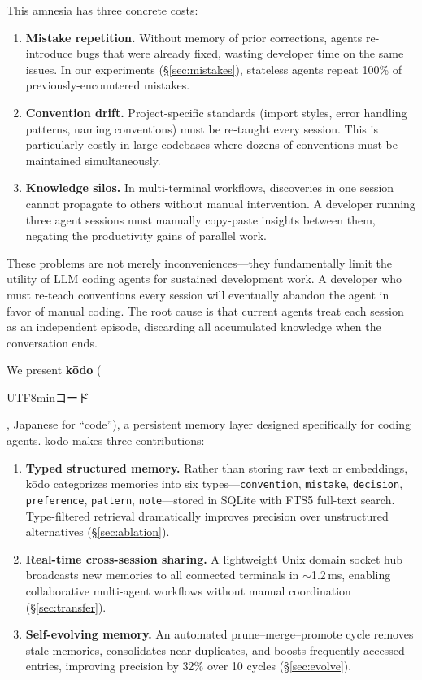 \documentclass{article}
\begin{document}
This amnesia has three concrete costs:
\begin{enumerate}
    \item \textbf{Mistake repetition.} Without memory of prior corrections, agents re-introduce bugs that were already fixed, wasting developer time on the same issues. In our experiments (\S\ref{sec:mistakes}), stateless agents repeat 100\% of previously-encountered mistakes.
    \item \textbf{Convention drift.} Project-specific standards (import styles, error handling patterns, naming conventions) must be re-taught every session. This is particularly costly in large codebases where dozens of conventions must be maintained simultaneously.
    \item \textbf{Knowledge silos.} In multi-terminal workflows, discoveries in one session cannot propagate to others without manual intervention. A developer running three agent sessions must manually copy-paste insights between them, negating the productivity gains of parallel work.
\end{enumerate}

These problems are not merely inconveniences---they fundamentally limit the utility of LLM coding agents for sustained development work. A developer who must re-teach conventions every session will eventually abandon the agent in favor of manual coding. The root cause is that current agents treat each session as an independent episode, discarding all accumulated knowledge when the conversation ends.

We present \textbf{k\=odo} (\begin{CJK}{UTF8}{min}コード\end{CJK}, Japanese for ``code''), a persistent memory layer designed specifically for coding agents. k\=odo makes three contributions:

\begin{enumerate}
    \item \textbf{Typed structured memory.} Rather than storing raw text or embeddings, k\=odo categorizes memories into six types---\texttt{convention}, \texttt{mistake}, \texttt{decision}, \texttt{preference}, \texttt{pattern}, \texttt{note}---stored in SQLite with FTS5 full-text search. Type-filtered retrieval dramatically improves precision over unstructured alternatives (\S\ref{sec:ablation}).
    \item \textbf{Real-time cross-session sharing.} A lightweight Unix domain socket hub broadcasts new memories to all connected terminals in $\sim$1.2\,ms, enabling collaborative multi-agent workflows without manual coordination (\S\ref{sec:transfer}).
    \item \textbf{Self-evolving memory.} An automated prune--merge--promote cycle removes stale memories, consolidates near-duplicates, and boosts frequently-accessed entries, improving precision by 32\% over 10 cycles (\S\ref{sec:evolve}).
\end{enumerate}
\end{document}

